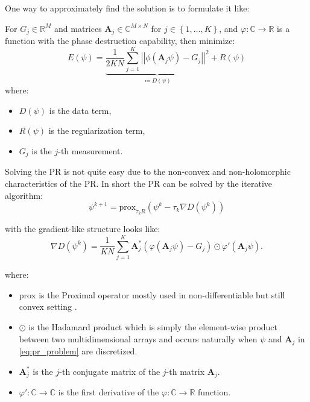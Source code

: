 \noindent One way to approximately find the solution is to formulate it like:
\begin{Pro}\label{pro:phase_retrieval_problem} For $G_j \in \mathbb{R}^M$ and matrices 
  $\boldsymbol{A}_j \in \mathbb{C}^{M \times N}$ for $j \in \left\{1,\ldots,K\right\}$, and 
  $\varphi \colon \mathbb{C} \to \mathbb{R}$ is a function with the phase destruction capability, then minimize:
  \begin{equation}\label{eq:phase_retrieval_problem}
    E(\psi) = \underbrace{\frac{1}{2KN} \sum_{j=1}^{K} {\left|\left|\phi(\boldsymbol{A}_j\psi)-G_j\right|\right|}^2}_{\coloneqq D(\psi)}+ R(\psi)
    \end{equation}
    where:
  \begin{itemize}
    \item $D(\psi)$ is the data term,
    \item $R(\psi)$ is the regularization term,
    \item $G_j$ is the $j$-th measurement.
    \end{itemize}
\end{Pro}

\noindent Solving the \acl*{PR} is not quite easy due to the non-convex and non-holomorphic characteristics of the \acl*{PR}. 
In short the \acl*{PR} can be solved by the iterative algorithm:
  \begin{equation}\label{eq:pr_solution}
	\psi^{k+1} = \text{prox}_{\tau_{k}R}(\psi^k-\tau_k\nabla{D(\psi^k)})
  \end{equation}

  with the gradient-like structure looks like: 
  \begin{equation}\label{eq:gradient_pr_solution}
	\nabla{D(\psi^k)} = \frac{1}{KN} \sum_{j=1}^{K} \boldsymbol{A}_j^*\left(\varphi\left(\boldsymbol{A}_j\psi\right)-G_j\right)\odot \varphi'(\boldsymbol{A}_j\psi).
  \end{equation}

  where:
  \begin{itemize}
	\item $\mathrm{prox}$ is the Proximal operator mostly used in non-differentiable but still convex setting \cite{Bredies2018}.
	\item $\odot$ is the Hadamard product\cite{Hackbusch2019} which is simply the element-wise product between two multidimensional arrays and occurs naturally when $\psi$ and $\boldsymbol{A}_j$ in \cref{eq:pr_problem} are discretized.
	\item $\boldsymbol{A}^*_j$ is the $j$-th conjugate matrix of the $j$-th matrix $\boldsymbol{A}_j$.
	\item $\varphi' \colon \mathbb{C} \to \mathbb{C}$ is the first derivative of the $\varphi \colon \mathbb{C} \to \mathbb{R}$ function.
  \end{itemize}

